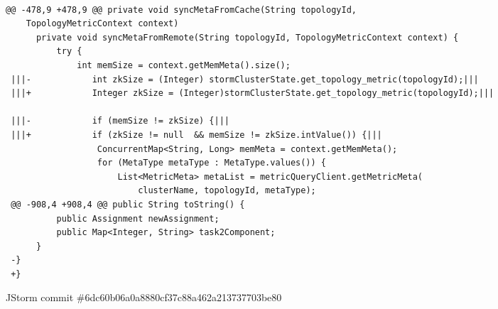 \begin{figure*}
\begin{lstlisting}[moredelim={[is][\color{red}]{|||}{|||}}]

@@ -478,9 +478,9 @@ private void syncMetaFromCache(String topologyId, 
    TopologyMetricContext context)
      private void syncMetaFromRemote(String topologyId, TopologyMetricContext context) {
          try {
              int memSize = context.getMemMeta().size();
 |||-            int zkSize = (Integer) stormClusterState.get_topology_metric(topologyId);|||
 |||+            Integer zkSize = (Integer)stormClusterState.get_topology_metric(topologyId);|||
  
 |||-            if (memSize != zkSize) {|||
 |||+            if (zkSize != null  && memSize != zkSize.intValue()) {|||
                  ConcurrentMap<String, Long> memMeta = context.getMemMeta();
                  for (MetaType metaType : MetaType.values()) {
                      List<MetricMeta> metaList = metricQueryClient.getMetricMeta(
                          clusterName, topologyId, metaType);
 @@ -908,4 +908,4 @@ public String toString() {
          public Assignment newAssignment;
          public Map<Integer, String> task2Component;
      }
 -}
 +} 

\end{lstlisting}
\caption{JStorm commit \#6dc60b06a0a8880cf37c88a462a213737703be80\label{fig:null}}
\end{figure*}